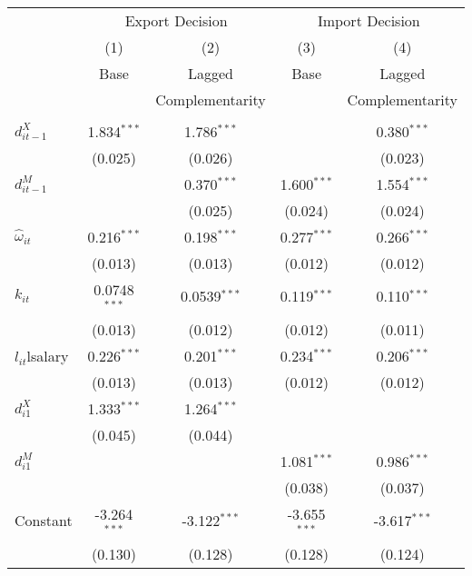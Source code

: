 \begin{center}
\begin{tabular}{l*{4}{c}}
\hline\hline&\multicolumn{2}{c}{Export
              Decision}&\multicolumn{2}{c}{Import Decision}\\
            &\multicolumn{1}{c}{(1)}&\multicolumn{1}{c}{(2)}&\multicolumn{1}{c}{(3)}&\multicolumn{1}{c}{(4)}\\
            &\multicolumn{1}{c}{Base}&\multicolumn{1}{c}{Lagged}&\multicolumn{1}{c}{Base}&\multicolumn{1}{c}{Lagged}\\
&\multicolumn{1}{c}{}&\multicolumn{1}{c}{Complementarity}&\multicolumn{1}{c}{}&\multicolumn{1}{c}{Complementarity}\\
\hline
   &                     &                     &                     &                     \\
$d_{it-1}^{X}$      &       1.834$^{***}$&       1.786$^{***}$&                     &       0.380$^{***}$\\
            &    (0.025)         &    (0.026)         &
                                    &    (0.023)         \\
[1em]
$d_{it-1}^{M}$      &                     &       0.370$^{***}$&       1.600$^{***}$&       1.554$^{***}$\\
            &                     &    (0.025)         &    (0.024)         &    (0.024)         \\
[1em]

$\hat{\omega}_{it}$    &       0.216$^{***}$&       0.198$^{***}$&       0.277$^{***}$&       0.266$^{***}$\\
            &    (0.013)         &    (0.013)         &    (0.012)         &    (0.012)         \\
[1em]
$k_{it}$        &      0.0748$^{***}$&      0.0539$^{***}$&       0.119$^{***}$&       0.110$^{***}$\\
            &    (0.013)         &    (0.012)         &    (0.012)         &    (0.011)         \\
[1em]
$l_{it}$lsalary     &       0.226$^{***}$&       0.201$^{***}$&       0.234$^{***}$&       0.206$^{***}$\\
            &    (0.013)         &    (0.013)         &    (0.012)         &    (0.012)         \\
[1em]
$d_{i1}^{X}$     &       1.333$^{***}$&       1.264$^{***}$&                     &                     \\
            &    (0.045)         &    (0.044)         &                     &                     \\
[1em]
$d_{i1}^{M}$     &                     &                     &       1.081$^{***}$&       0.986$^{***}$\\
            &                     &                     &    (0.038)         &    (0.037)         \\
[1em]
Constant      &      -3.264$^{***}$&      -3.122$^{***}$&      -3.655$^{***}$&      -3.617$^{***}$\\
            &     (0.130)         &     (0.128)         &     (0.128)         &     (0.124)         \\
\hline


\end{tabular}
\end{center}
